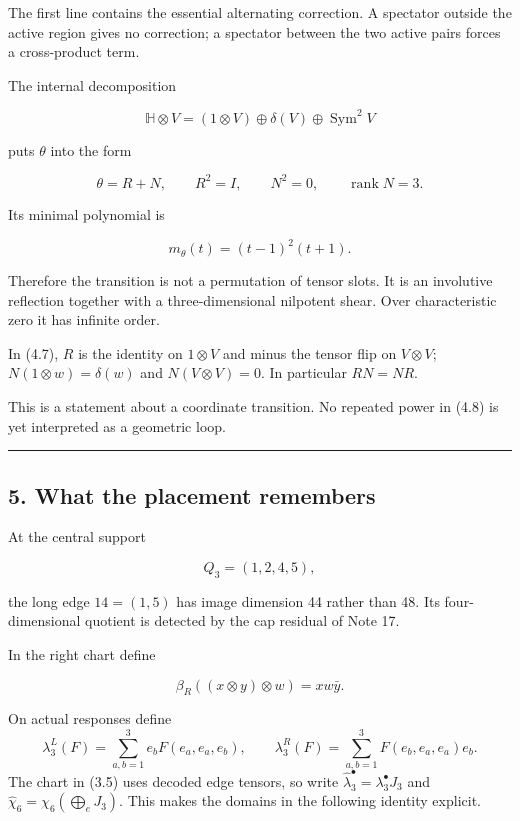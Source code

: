 \documentclass[
  11pt,
  a4paper,
]{article}
\begin{document}
The first line contains the essential alternating correction. A
spectator outside the active region gives no correction; a spectator
between the two active pairs forces a cross-product term.

The internal decomposition

\[
\mathbb H\otimes V
=
(1\otimes V)\oplus\delta(V)\oplus\operatorname{Sym}^2V
\tag{4.6}
\]

puts \(\theta\) into the form

\[
\theta=R+N,
\qquad
R^2=I,
\qquad
N^2=0,
\qquad
\operatorname{rank}N=3.
\tag{4.7}
\]

Its minimal polynomial is

\[
\boxed{m_\theta(t)=(t-1)^2(t+1).}
\tag{4.8}
\]

Therefore the transition is not a permutation of tensor slots. It is an
involutive reflection together with a three-dimensional nilpotent shear.
Over characteristic zero it has infinite order.

In (4.7), \(R\) is the identity on \(1\otimes V\) and minus the tensor
flip on \(V\otimes V\); \(N(1\otimes w)=\delta(w)\) and
\(N(V\otimes V)=0\). In particular \(RN=NR\).

This is a statement about a coordinate transition. No repeated power in
(4.8) is yet interpreted as a geometric loop.

\begin{center}\rule{0.5\linewidth}{0.5pt}\end{center}

\hypertarget{what-the-placement-remembers}{%
\subsection{5. What the placement
remembers}\label{what-the-placement-remembers}}

At the central support

\[
Q_3=(1,2,4,5),
\tag{5.1}
\]

the long edge \(14=(1,5)\) has image dimension 44 rather than 48. Its
four-dimensional quotient is detected by the cap residual of Note 17.

In the right chart define

\[
\beta_R((x\otimes y)\otimes w)=xw\bar y.
\tag{5.2}
\]

On actual responses define \[
 \lambda_3^L(F)=\sum_{a,b=1}^3 e_bF(e_a,e_a,e_b),\qquad
 \lambda_3^R(F)=\sum_{a,b=1}^3 F(e_b,e_a,e_a)e_b.
\] The chart in (3.5) uses decoded edge tensors, so write
\(\widehat\lambda_3^\bullet=\lambda_3^\bullet J_3\) and
\(\widehat\chi_6=\chi_6(\bigoplus_e J_3)\). This makes the domains in
the following identity explicit.
\end{document}
